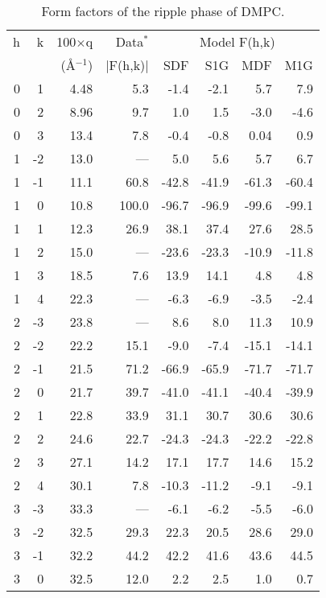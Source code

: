 \begin{table}
\caption{Form factors of the ripple phase of DMPC.
\label{formfactor}}
\vspace{6pt}
{\small
\tabcolsep=0.20in
\begin{tabular}{rrrrrrrr} \hline
h & k & 100$\times$q & Data$^{*}$ &
        \multicolumn{4}{c}{Model F(h,k)} \\ \cline{5-8}
& & (\AA$^{-1}$) & $|$F(h,k)$|$ & SDF & S1G & MDF & M1G \\ \hline
0 &  1 & 4.48  &  5.3  &  -1.4 & -2.1 & 5.7 &  7.9  \\
0 &  2 & 8.96  & 9.7  &  1.0  &  1.5 & -3.0 & -4.6 \\
0 &  3 & 13.4  &  7.8  &  -0.4  & -0.8 & 0.04 &  0.9 \\
1 &  -2 & 13.0  &  ---  &  5.0  & 5.6 & 5.7 &  6.7   \\
1 &  -1 & 11.1  &  60.8  &  -42.8  & -41.9 & -61.3 &  -60.4 \\
1 &   0 & 10.8  &  100.0  &  -96.7  & -96.9 & -99.6 &  -99.1 \\
1 &   1 & 12.3  &  26.9  &  38.1  & 37.4 & 27.6 &  28.5 \\
1 &   2 & 15.0  &  ---  &  -23.6  & -23.3 & -10.9 &  -11.8 \\
1 &   3 & 18.5  &  7.6  &  13.9  & 14.1 & 4.8 &  4.8 \\
1 &   4 & 22.3  &  ---  &  -6.3  & -6.9 & -3.5 &  -2.4 \\
2 &  -3 & 23.8  &  ---  &  8.6  & 8.0 & 11.3 &  10.9 \\
2 &  -2 & 22.2  &  15.1  &  -9.0  & -7.4 & -15.1 &  -14.1 \\
2 &  -1 & 21.5  &  71.2  &  -66.9  & -65.9 & -71.7 &  -71.7 \\
2 &   0 & 21.7  &  39.7  &  -41.0  & -41.1 & -40.4 &  -39.9 \\
2 &   1 & 22.8  &  33.9  &  31.1  & 30.7 & 30.6 &  30.6 \\
2 &   2 & 24.6  &  22.7  &  -24.3  & -24.3 & -22.2 &  -22.8 \\
2 &   3 & 27.1  &  14.2  &  17.1  & 17.7 & 14.6 &  15.2 \\
2 &   4 & 30.1  &  7.8  &  -10.3  & -11.2 & -9.1 &  -9.1 \\
3 &  -3 & 33.3  &  ---  &  -6.1  & -6.2 & -5.5 &  -6.0 \\
3 &  -2 & 32.5  &  29.3  &  22.3  & 20.5 & 28.6 &  29.0 \\
3 &  -1 & 32.2  &  44.2  &  42.2  & 41.6 & 43.6 &  44.5 \\
3 &   0 & 32.5  &  12.0    &  2.2  & 2.5 & 1.0 &  0.7   \\

\end{tabular}}
\end{table}
